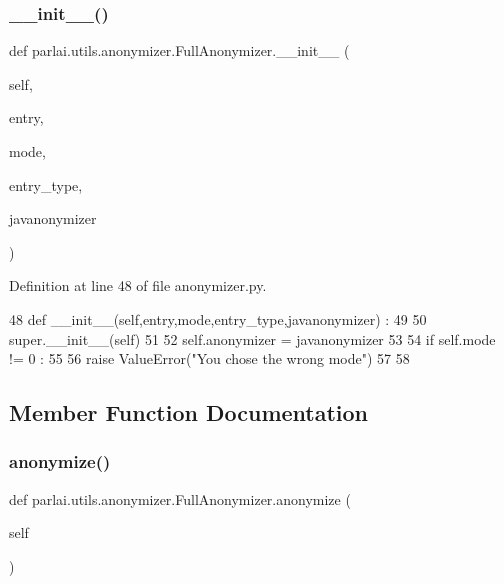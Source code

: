 \subsubsection{\texorpdfstring{\+\_\+\+\_\+init\+\_\+\+\_\+()}{\_\_init\_\_()}}
{\footnotesize\ttfamily def parlai.\+utils.\+anonymizer.\+Full\+Anonymizer.\+\_\+\+\_\+init\+\_\+\+\_\+ (\begin{DoxyParamCaption}\item[{}]{self,  }\item[{}]{entry,  }\item[{}]{mode,  }\item[{}]{entry\+\_\+type,  }\item[{}]{javanonymizer }\end{DoxyParamCaption})}



Definition at line 48 of file anonymizer.\+py.


\begin{DoxyCode}
48     \textcolor{keyword}{def }\_\_init\_\_(self,entry,mode,entry\_type,javanonymizer) : 
49 
50         super.\_\_init\_\_(self)
51 
52         self.anonymizer = javanonymizer
53 
54         \textcolor{keywordflow}{if} self.mode != 0 :  
55 
56             \textcolor{keywordflow}{raise} ValueError(\textcolor{stringliteral}{"You chose the wrong mode"}) 
57 
58 
\end{DoxyCode}


\subsection{Member Function Documentation}
\mbox{\label{classparlai_1_1utils_1_1anonymizer_1_1FullAnonymizer_a52bb75b8a8406fd69f3fec4134bab054}} 
\subsubsection{\texorpdfstring{anonymize()}{anonymize()}}
{\footnotesize\ttfamily def parlai.\+utils.\+anonymizer.\+Full\+Anonymizer.\+anonymize (\begin{DoxyParamCaption}\item[{}]{self }\end{DoxyParamCaption})}



